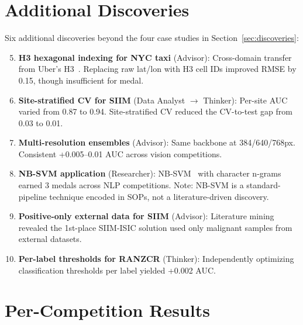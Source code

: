 \documentclass{article}
\begin{document}
\section{Additional Discoveries}
\label{app:additional_discoveries}

Six additional discoveries beyond the four case studies in Section~\ref{sec:discoveries}:

\begin{enumerate}[leftmargin=1.5em,itemsep=3pt]
\setcounter{enumi}{4}
    \item \textbf{H3 hexagonal indexing for NYC taxi} (Advisor): Cross-domain transfer from Uber's H3~\citep{brodsky2018h3}. Replacing raw lat/lon with H3 cell IDs improved RMSE by 0.15, though insufficient for medal.
    \item \textbf{Site-stratified CV for SIIM} (Data Analyst $\rightarrow$ Thinker): Per-site AUC varied from 0.87 to 0.94. Site-stratified CV reduced the CV-to-test gap from 0.03 to 0.01.
    \item \textbf{Multi-resolution ensembles} (Advisor): Same backbone at 384/640/768px. Consistent +0.005--0.01 AUC across vision competitions.
    \item \textbf{NB-SVM application} (Researcher): NB-SVM~\citep{wang2012nbsvm} with character n-grams earned 3 medals across NLP competitions. Note: NB-SVM is a standard-pipeline technique encoded in SOPs, not a literature-driven discovery.
    \item \textbf{Positive-only external data for SIIM} (Advisor): Literature mining revealed the 1st-place SIIM-ISIC solution used only malignant samples from external datasets.
    \item \textbf{Per-label thresholds for RANZCR} (Thinker): Independently optimizing classification thresholds per label yielded +0.002 AUC.
\end{enumerate}

\section{Per-Competition Results}
\label{app:per_comp}
\end{document}
